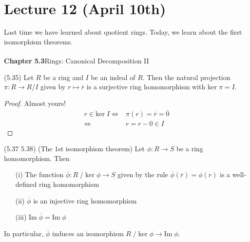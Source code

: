 \section{Lecture 12 (April 10th)}
Last time we have learned about quotient rings. Today, we learn about the first isomorphism theorems. \\\\
{\bf Chapter 5.3}\hspace{2ex}Rings: Canonical Decomposition II
\\
\begin{prop}
(5.35) Let $R$ be a ring and $I$ be an indeal of $R$. Then the natural projection $\pi :R\rightarrow R/I$ given by $r\mapsto \overline{r}$ is a surjective ring homomorphism with $\mathrm{ker}\;\pi =I$.
\end{prop}
\vspace{2ex}
\begin{proof}
Almost yours!
\begin{align*}
r\in \mathrm{ker}\;I \iff& \pi (r)=\overline{r}=\overline{0}\\
\iff& r=r-0\in I
\end{align*}
\end{proof}
\vspace{2ex}
\begin{thm}
(5.37 5.38) (The 1st isomorphism theorem) Let $\phi :R\rightarrow S$ be a ring homomorphism. Then
\begin{itemize}
\item[(i)] The function $\overline{\phi }:R\;/\;\mathrm{ker}\;\phi \rightarrow S$ given by the rule $\overline{\phi }(\overline{r})=\phi (r)$ is a well-defined ring homomorphism
\item[(ii)] $\overline{\phi }$ is an injective ring homomorphism
\item[(iii)] $\mathrm{Im}\;\overline{\phi }=\mathrm{Im}\;\phi $
\end{itemize}In particular, $\overline{\phi }$ induces an isomorphism $R\;/\;\mathrm{ker}\;\phi \rightarrow \mathrm{Im}\;\phi $. 
\end{thm}
\vspace{2ex}
